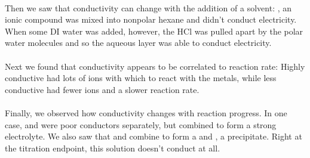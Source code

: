 \documentclass[fleqn,titlepage]{article}
\begin{document}
  \paragraph{} Then we saw that conductivity can change with the addition of a solvent: , an ionic compound was mixed into nonpolar hexane and didn't conduct electricity. When some DI water was added, however, the HCl was pulled apart by the polar water molecules and so the aqueous layer was able to conduct electricity.
  \paragraph{} Next we found that conductivity appears to be correlated to reaction rate: Highly conductive  had lots of  ions with which to react with the metals, while less conductive  had fewer  ions and a slower reaction rate.
  \paragraph{} Finally, we observed how conductivity changes with reaction progress. In one case,  and  were poor conductors separately, but combined to form a strong electrolyte. We also saw that  and  combine to form a  and , a precipitate. Right at the titration endpoint, this solution doesn't conduct at all.
\end{document}
